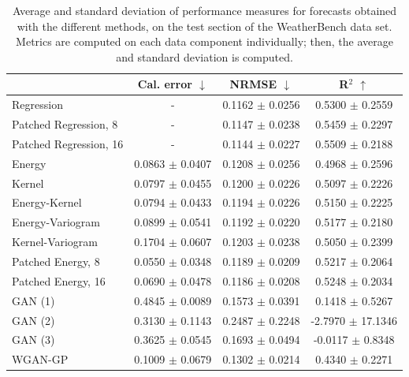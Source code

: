 \documentclass[twoside,11pt]{article}
\begin{document}
	
	\begin{table}[tb]
		\begin{center}
			\begin{tabular}{lccc}
				\toprule
				& Cal. error $ \downarrow $ & NRMSE $ \downarrow $ & R$ ^2 $ $ \uparrow $ \\
				\midrule
				Regression & - & 0.1162  $ \pm$ 0.0256 &  0.5300 $ \pm$ 0.2559 \\
				Patched Regression, 8 & - & 0.1147  $ \pm$ 0.0238 &  0.5459 $ \pm$ 0.2297  \\
				Patched Regression, 16 & - & 0.1144  $ \pm$ 0.0227 &  0.5509 $ \pm$ 0.2188 \\
				Energy & 0.0863 $ \pm$ 0.0407 & 0.1208  $ \pm$ 0.0256 &  0.4968 $ \pm$ 0.2596 \\
				Kernel & 0.0797 $ \pm$ 0.0455 & 0.1200  $ \pm$ 0.0226 &  0.5097 $ \pm$ 0.2226 \\
				Energy-Kernel &0.0794 $ \pm$ 0.0433 & 0.1194  $ \pm$ 0.0226 &  0.5150 $ \pm$ 0.2225  \\
				Energy-Variogram & 0.0899 $ \pm$ 0.0541 & 0.1192  $ \pm$ 0.0220 &  0.5177 $ \pm$ 0.2180  \\
				Kernel-Variogram &0.1704 $ \pm$ 0.0607 & 0.1203  $ \pm$ 0.0238 &  0.5050 $ \pm$ 0.2399  \\
				Patched Energy, 8 & 0.0550 $ \pm$ 0.0348 & 0.1189  $ \pm$ 0.0209 &  0.5217 $ \pm$ 0.2064 \\
				Patched Energy, 16 & 0.0690 $ \pm$ 0.0478 & 0.1186  $ \pm$ 0.0208 &  0.5248 $ \pm$ 0.2034  \\
				GAN (1) & 	0.4845 $ \pm$ 0.0089 & 0.1573  $ \pm$ 0.0391 &  0.1418 $ \pm$ 0.5267  \\
				GAN (2) & 	0.3130 $ \pm$ 0.1143 & 0.2487  $ \pm$ 0.2248 &  -2.7970 $ \pm$ 17.1346  \\
				GAN (3) & 0.3625 $ \pm$ 0.0545 & 0.1693  $ \pm$ 0.0494 &  -0.0117 $ \pm$ 0.8348  \\
				WGAN-GP & 0.1009 $ \pm$ 0.0679 & 0.1302  $ \pm$ 0.0214 &  0.4340 $ \pm$ 0.2271  \\
				\bottomrule
			\end{tabular}
		\end{center}
		\caption{Average and standard deviation of performance measures for forecasts obtained with the different methods, on the test section of the WeatherBench data set. Metrics are computed on each data component individually; then, the average and standard deviation is computed.}	\label{tab:res_weatherbench_}
	\end{table}
	
\end{document}
